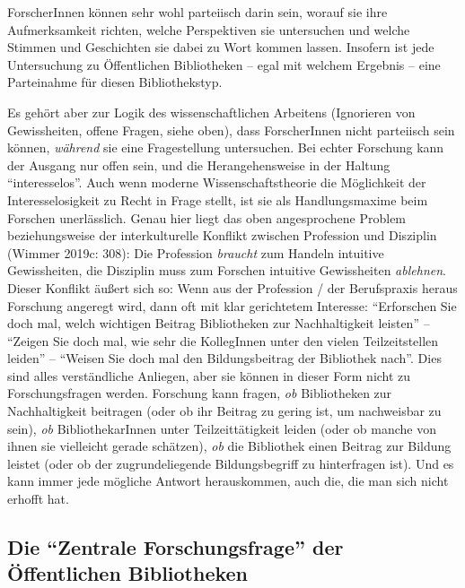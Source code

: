 \documentclass[a4paper,
fontsize=11pt,
oneside,
numbers=noperiodatend,
parskip=half-,
bibliography=totoc,
final
]{scrartcl}
\begin{document}
ForscherInnen können sehr wohl parteiisch darin sein, worauf sie ihre
Aufmerksamkeit richten, welche Perspektiven sie untersuchen und welche
Stimmen und Geschichten sie dabei zu Wort kommen lassen. Insofern ist
jede Untersuchung zu Öffentlichen Bibliotheken -- egal mit welchem
Ergebnis -- eine Parteinahme für diesen Bibliothekstyp.

Es gehört aber zur Logik des wissenschaftlichen Arbeitens (Ignorieren
von Gewissheiten, offene Fragen, siehe oben), dass ForscherInnen nicht
parteiisch sein können, \emph{während} sie eine Fragestellung
untersuchen. Bei echter Forschung kann der Ausgang nur offen sein, und
die Herangehensweise in der Haltung \enquote{interesselos}. Auch wenn
moderne Wissenschaftstheorie die Möglichkeit der Interesselosigkeit zu
Recht in Frage stellt, ist sie als Handlungsmaxime beim Forschen
unerlässlich. Genau hier liegt das oben angesprochene Problem
beziehungsweise der interkulturelle Konflikt zwischen Profession und
Disziplin (Wimmer 2019c: 308): Die Profession \emph{braucht} zum Handeln
intuitive Gewissheiten, die Disziplin muss zum Forschen intuitive
Gewissheiten \emph{ablehnen}. Dieser Konflikt äußert sich so: Wenn aus
der Profession / der Berufspraxis heraus Forschung angeregt wird, dann
oft mit klar gerichtetem Interesse: \enquote{Erforschen Sie doch mal,
welch wichtigen Beitrag Bibliotheken zur Nachhaltigkeit leisten} --
\enquote{Zeigen Sie doch mal, wie sehr die KollegInnen unter den vielen
Teilzeitstellen leiden} -- \enquote{Weisen Sie doch mal den
Bildungsbeitrag der Bibliothek nach}. Dies sind alles verständliche
Anliegen, aber sie können in dieser Form nicht zu Forschungsfragen
werden. Forschung kann fragen, \emph{ob} Bibliotheken zur Nachhaltigkeit
beitragen (oder ob ihr Beitrag zu gering ist, um nachweisbar zu sein),
\emph{ob} BibliothekarInnen unter Teilzeittätigkeit leiden (oder ob
manche von ihnen sie vielleicht gerade schätzen), \emph{ob} die
Bibliothek einen Beitrag zur Bildung leistet (oder ob der
zugrundeliegende Bildungsbegriff zu hinterfragen ist). Und es kann immer
jede mögliche Antwort herauskommen, auch die, die man sich nicht erhofft
hat.

\hypertarget{die-zentrale-forschungsfrage-der-uxf6ffentlichen-bibliotheken}{%
\subsection{\texorpdfstring{Die \enquote{Zentrale Forschungsfrage} der
Öffentlichen
Bibliotheken}{Die ``Zentrale Forschungsfrage'' der Öffentlichen Bibliotheken}}\label{die-zentrale-forschungsfrage-der-uxf6ffentlichen-bibliotheken}}
\end{document}
